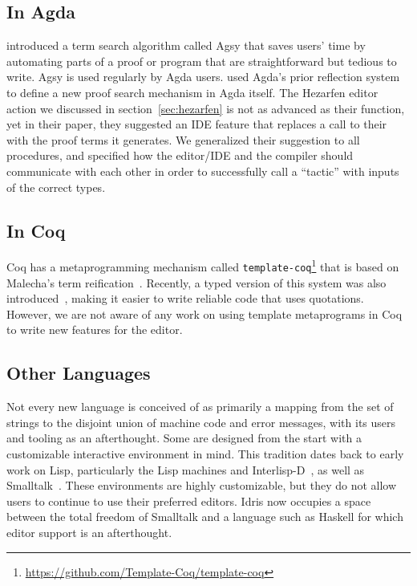 \subsection{In Agda}

\citet{agsy} introduced a term search algorithm called
Agsy that saves users' time by automating
parts of a proof or program that are straightforward but tedious to write.
Agsy is used regularly by Agda users.
\citet{autoinagda} used Agda's prior reflection system to define a
new proof search mechanism in Agda itself.
The Hezarfen editor action we discussed in section~\ref{sec:hezarfen} is not as advanced
as their  function, yet in their paper, they suggested an IDE feature
that replaces a call to their  with the proof terms it generates.
We generalized their suggestion to all \Elab{} procedures, and specified
how the editor/IDE and the compiler should communicate with each other
in order to successfully call a ``tactic'' with inputs of the correct types.

\subsection{In Coq}

Coq has a metaprogramming mechanism called
\texttt{template-coq}\footnote{\url{https://github.com/Template-Coq/template-coq}}
that is based on Malecha's term
reification~\cite{malecha-phd}. Recently, a typed version of this
system was also introduced~\cite{typed-template-coq}, making it easier
to write reliable code that uses quotations.  However, we are not
aware of any work on using template metaprograms in Coq to write new
features for the editor.

\subsection{Other Languages}

Not every new language is conceived of as primarily a mapping from the
set of strings to the disjoint union of machine code and error
messages, with its users and tooling as an afterthought. Some are
designed from the start with a customizable interactive environment in
mind. This tradition dates back to early work on Lisp, particularly
the Lisp machines and Interlisp-D~\citep{LispHist}, as well as
Smalltalk~\citep{Goldberg1984SmalltalkEnv}. These environments are
highly customizable, but they do not allow users to continue to use
their preferred editors. Idris now occupies a space between the total
freedom of Smalltalk and a language such as Haskell for which editor
support is an afterthought.

